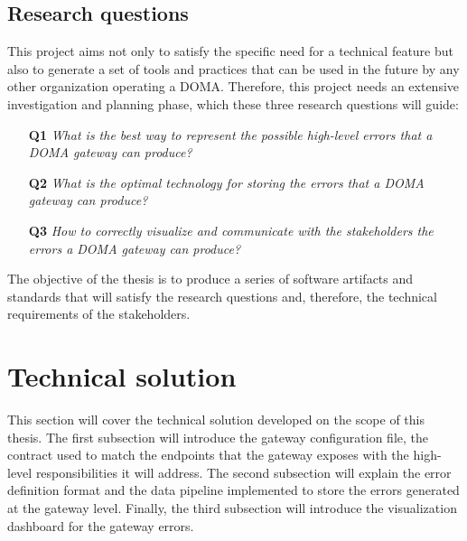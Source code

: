 \documentclass[english, 12pt, a4paper, sci, utf8, a-1b, online]{aaltothesis}
\begin{document}
\subsection{Research questions}
\label{sec:research-questions}


This project aims not only to satisfy the specific need for a technical feature but also to generate a set of tools and practices that can be used in the future by any other organization operating a DOMA. Therefore, this project needs an extensive investigation and planning phase, which these three research questions will guide:

\begin{itemize}
    \item[\textbf{Q1}] \textit{What is the best way to represent the possible high-level errors that a DOMA gateway can produce?}
    \item[\textbf{Q2}] \textit{What is the optimal technology for storing the errors that a DOMA gateway can produce?}
    \item[\textbf{Q3}] \textit{How to correctly visualize and communicate with the stakeholders the errors a DOMA gateway can produce?}
\end{itemize}

The objective of the thesis is to produce a series of software artifacts and standards that will satisfy the research questions and, therefore, the technical requirements of the stakeholders.

\clearpage
\section{Technical solution}
\label{sec:technical-solution}


This section will cover the technical solution developed on the scope of this thesis. The first subsection will introduce the gateway configuration file, the contract used to match the endpoints that the gateway exposes with the high-level responsibilities it will address. The second subsection will explain the error definition format and the data pipeline implemented to store the errors generated at the gateway level. Finally, the third subsection will introduce the visualization dashboard for the gateway errors.
\end{document}
